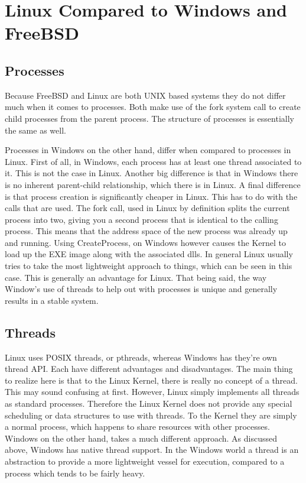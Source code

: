 \documentclass[letterpaper,10pt,titlepage,draftclsnofoot,onecolumn]{IEEEtran}
\begin{document}
\section{Linux Compared to Windows and FreeBSD}
\subsection{Processes}
Because FreeBSD and Linux are both UNIX based systems they do not differ much when it comes to processes. Both make use of the fork system call to create child processes from the parent process. The structure of processes is essentially the same as well. 

Processes in Windows on the other hand, differ when compared to processes in Linux. First of all, in Windows, each process has at least one thread associated to it. This is not the case in Linux. Another big difference is that in Windows there is no inherent parent-child relationship, which there is in Linux. A final difference is that process creation is significantly cheaper in Linux. This has to do with the calls that are used. The fork call, used in Linux by definition splits the current process into two, giving you a second process that is identical to the calling process. This means that the address space of the new process was already up and running. Using CreateProcess, on Windows however causes the Kernel to load up the EXE image along with the associated dlls. In general Linux usually tries to take the most lightweight approach to things, which can be seen in this case. This is generally an advantage for Linux. That being said, the way Window's use of threads to help out with processes is unique and generally results in a stable system. 

\subsection{Threads}

Linux uses POSIX threads, or pthreads, whereas Windows has they're own thread API. Each have different advantages and disadvantages. The main thing to realize here is that to the Linux Kernel, there is really no concept of a thread. This may sound confusing at first. However, Linux simply implements all threads as standard processes. Therefore the Linux Kernel does not provide any special scheduling or data structures to use with threads. To the Kernel they are simply a normal process, which happens to share resources with other processes. \cite{linux} Windows on the other hand, takes a much different approach. As discussed above, Windows has native thread support. In the Windows world a thread is an abstraction to provide a more lightweight vessel for execution, compared to a process which tends to be fairly heavy. 
\end{document}
